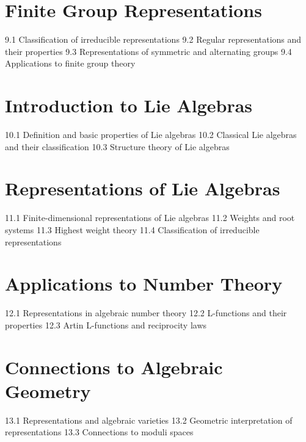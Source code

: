 \section{Finite Group Representations}
9.1 Classification of irreducible representations
9.2 Regular representations and their properties
9.3 Representations of symmetric and alternating groups
9.4 Applications to finite group theory
\section{Introduction to Lie Algebras}
10.1 Definition and basic properties of Lie algebras
10.2 Classical Lie algebras and their classification
10.3 Structure theory of Lie algebras
\section{Representations of Lie Algebras}
11.1 Finite-dimensional representations of Lie algebras
11.2 Weights and root systems
11.3 Highest weight theory
11.4 Classification of irreducible representations
\section{Applications to Number Theory}
12.1 Representations in algebraic number theory
12.2 L-functions and their properties
12.3 Artin L-functions and reciprocity laws
\section{Connections to Algebraic Geometry}
13.1 Representations and algebraic varieties
13.2 Geometric interpretation of representations
13.3 Connections to moduli spaces
